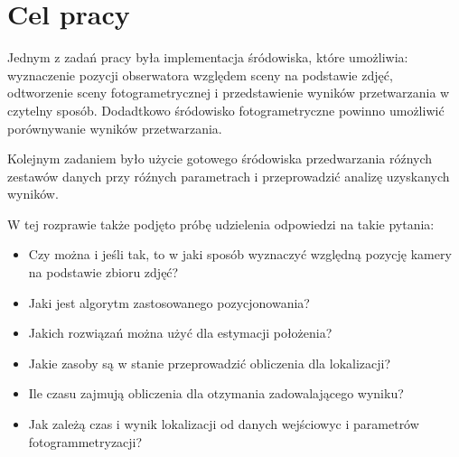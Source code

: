 \pagebreak

\section{Cel pracy}

Jednym z zadań pracy była implementacja śródowiska, które umożliwia: wyznaczenie pozycji obserwatora względem sceny na podstawie zdjęć, odtworzenie sceny fotogrametrycznej i przedstawienie wyników przetwarzania w czytelny sposób.
Dodadtkowo śródowisko fotogrametryczne powinno umożliwić porównywanie wyników przetwarzania.

Kolejnym zadaniem było użycie gotowego śródowiska przedwarzania róźnych zestawów danych przy róźnych parametrach i przeprowadzić analizę uzyskanych wyników.

W tej rozprawie także podjęto próbę udzielenia odpowiedzi na takie pytania:
\begin{itemize}
   \item Czy można i jeśli tak, to w jaki sposób wyznaczyć względną pozycję kamery na podstawie zbioru zdjęć?
   \item Jaki jest algorytm zastosowanego pozycjonowania?
   \item Jakich rozwiązań można użyć dla estymacji położenia?
   \item Jakie zasoby są w stanie przeprowadzić obliczenia dla lokalizacji?
   \item Ile czasu zajmują obliczenia dla otzymania zadowalającego wyniku?
   \item Jak zależą czas i wynik lokalizacji od danych wejściowyc i parametrów fotogrammetryzacji?
\end{itemize}

